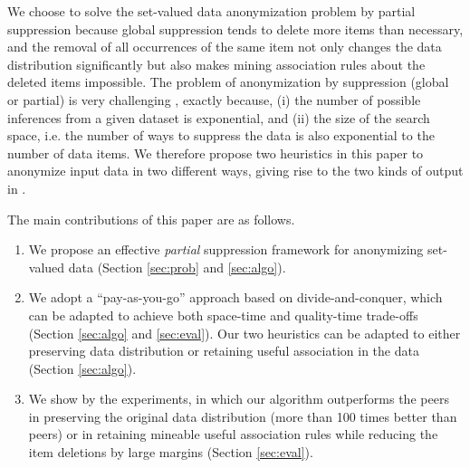 We choose to solve the set-valued data anonymization problem by partial
suppression because global suppression tends to
delete more items than necessary,
and the removal of all occurrences of the same item not only changes the
data distribution significantly but also makes mining association rules
about the deleted items impossible.
%
The problem of anonymization by suppression (global or partial) is very
challenging \cite{atallah99:disclosure,Xu:2008:ATD}, exactly because, (i) the number of possible inferences from
a given dataset is exponential, and (ii) the size of the search space, i.e.
the number of ways to suppress the data is also exponential to the number of
data items. We therefore propose two heuristics in this paper to anonymize
input data in two different ways, giving rise to the two kinds of output
in .

The main contributions of this paper are as follows.
\begin{enumerate}
\item We propose an effective \emph{partial} suppression framework for anonymizing
    set-valued data (Section \ref{sec:prob} and
    \ref{sec:algo}).
\item We adopt a ``pay-as-you-go'' approach based on divide-and-conquer,
    which can be adapted to achieve both space-time and quality-time
    trade-offs (Section \ref{sec:algo} and \ref{sec:eval}). Our two heuristics
    can be adapted to either preserving data distribution or retaining useful
    association in the data (Section \ref{sec:algo}).
\item We show by the experiments, in which our algorithm outperforms
    the peers in preserving the original data distribution 
	(more than 100 times better
    than peers) or in retaining mineable useful association
    rules while reducing the item deletions
    by large margins (Section \ref{sec:eval}).
\end{enumerate}
